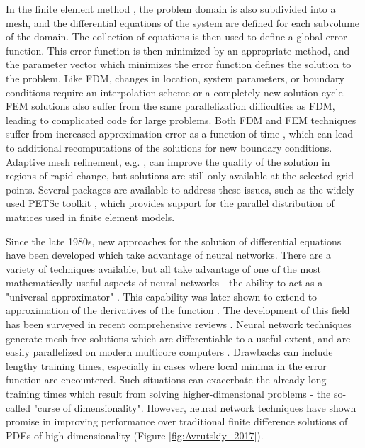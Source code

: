 \documentclass{article}
\begin{document}
In the finite element method \cite{DeVries2011}, the problem domain is also subdivided into a mesh, and the differential equations of the system are defined for each subvolume of the domain. The collection of equations is then used to define a global error function. This error function is then minimized by an appropriate method, and the parameter vector which minimizes the error function defines the solution to the problem. Like FDM, changes in location, system parameters, or boundary conditions require an interpolation scheme or a completely new solution cycle. FEM solutions also suffer from the same parallelization difficulties as FDM, leading to complicated code for large problems. Both FDM and FEM techniques suffer from increased approximation error as a function of time \cite{Carnahan1969}, which can lead to additional recomputations of the solutions for new boundary conditions. Adaptive mesh refinement, e.g. \cite{Berger1989}, can improve the quality of the solution in regions of rapid change, but solutions are still only available at the selected grid points. Several packages are available to address these issues, such as the widely-used PETSc toolkit \cite{petsc}, which provides support for the parallel distribution of matrices used in finite element models.

Since the late 1980s, new approaches for the solution of differential equations have been developed which take advantage of neural networks. There are a variety of techniques available, but all take advantage of one of the most mathematically useful aspects of neural networks - the ability to act as a "universal approximator" \cite{Hornik1989}. This capability was later shown to extend to approximation of the derivatives of the function \cite{Hornik1990}. The development of this field has been surveyed in recent comprehensive reviews \cite{Yadav2015,Chakraverty2017}. Neural network techniques generate mesh-free solutions which are differentiable to a useful extent, and are easily parallelized on modern multicore computers \cite{Schuessler2011}. Drawbacks can include lengthy training times, especially in cases where local minima in the error function are encountered. Such situations can exacerbate the already long training times which result from solving higher-dimensional problems - the so-called "curse of dimensionality". However, neural network techniques have shown promise in improving performance over traditional finite difference solutions of PDEs of high dimensionality (Figure \ref{fig:Avrutskiy_2017}).
\end{document}
